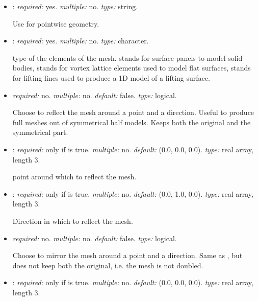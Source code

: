 \begin{itemize}

\item {}: \textit{required:} yes. \textit{multiple:} no. \textit{type:} string. 

Use  for pointwise geometry.

\item {}: \textit{required:} yes. \textit{multiple:} no. \textit{type:} character.

    type of the elements of the mesh.  stands for surface panels to model 
    solid bodies,  stands for vortex lattice elements used to model flat surfaces, 
    {\color{red} stands for lifting lines used to produce a 1D model of a lifting surface}. 

\item {} \textit{required:} no. \textit{multiple:} no. \textit{default:} false. \textit{type:} logical.

Choose to reflect the mesh around a point and a direction. Useful to produce full meshes out of 
symmetrical half models. Keeps both the original and the symmetrical part. 

\item {}: \textit{required:} only if  is true. 
\textit{multiple:} no. \textit{default:} (0.0, 0.0, 0.0). \textit{type:} real array, length 3.

point around which to reflect the mesh.

\item {}: \textit{required:} only if  is true. 
\textit{multiple:} no. \textit{default:} (0.0, 1.0, 0.0). \textit{type:} real array, length 3.

Direction in which to reflect the mesh.

\item {} \textit{required:} no. \textit{multiple:} no. \textit{default:} 
false. 
\textit{type:} logical.

Choose to mirror the mesh around a point and a direction. Same as , but 
does not keep both the original, i.e. the mesh is not doubled.

\item {}: \textit{required:} only if  is true. 
\textit{multiple:} no. \textit{default:} (0.0, 0.0, 0.0). \textit{type:} real array, length 3.


\end{itemize}
